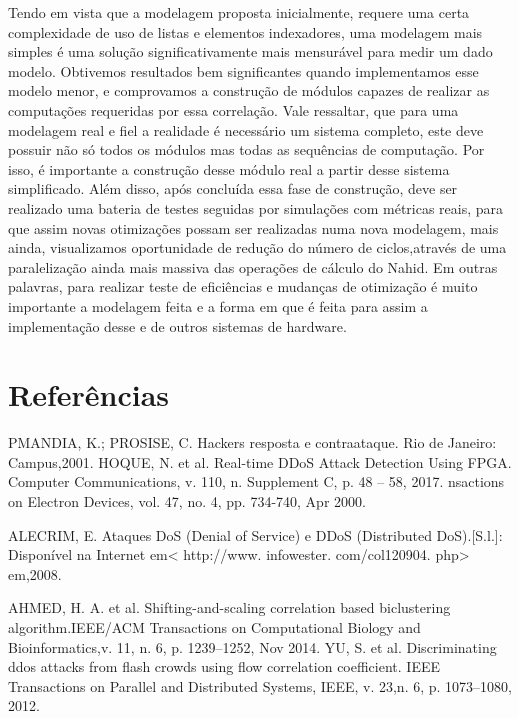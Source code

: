 \documentclass[conference]{IEEEtran}
\begin{document}
	Tendo em vista que a modelagem proposta inicialmente, requere uma certa complexidade de uso de listas e elementos indexadores, uma modelagem mais simples é uma solução significativamente mais mensurável para medir um dado modelo. Obtivemos resultados bem significantes quando implementamos esse modelo menor, e comprovamos a construção de módulos capazes de realizar as computações requeridas por essa correlação. Vale ressaltar, que para uma modelagem real e fiel a realidade é necessário um sistema completo, este deve possuir não só todos os módulos mas todas as sequências de computação. Por isso, é importante a construção desse módulo real a partir desse sistema simplificado. Além disso, após concluída essa fase de construção, deve ser realizado uma bateria de testes seguidas por simulações com métricas reais, para que assim novas otimizações possam ser realizadas numa nova modelagem, mais ainda, visualizamos oportunidade de redução do número de ciclos,através de uma paralelização ainda mais massiva das operações de cálculo do Nahid. Em outras palavras, para realizar teste de eficiências e mudanças de otimização é muito importante a modelagem feita e a forma em que é feita para assim a implementação desse e de outros sistemas de hardware.  
	
	
	\section*{Referências}
	\renewcommand{\section}[2]{}
	
	\begin{thebibliography}{00}
		  PMANDIA, K.; PROSISE, C. Hackers resposta e contraataque. Rio de Janeiro: Campus,2001.
		HOQUE, N. et al. Real-time DDoS Attack Detection Using FPGA. Computer Communications, v. 110, n. Supplement C, p. 48 – 58, 2017.
		nsactions on Electron Devices, vol. 47, no. 4, pp. 734-740, Apr 2000.
		
		ALECRIM, E. Ataques DoS (Denial of Service) e DDoS (Distributed DoS).[S.l.]: Disponível na Internet em< http://www. infowester. com/col120904. php> em,2008.
		
		 AHMED, H. A. et al. Shifting-and-scaling correlation based biclustering algorithm.IEEE/ACM Transactions on Computational Biology and Bioinformatics,v. 11, n. 6, p. 1239–1252, Nov 2014.
		 YU, S. et al. Discriminating ddos attacks from flash crowds using flow correlation coefficient. IEEE Transactions on Parallel and Distributed Systems, IEEE, v. 23,n. 6, p. 1073–1080, 2012.
	
	\end{thebibliography}
	
	
\end{document}
